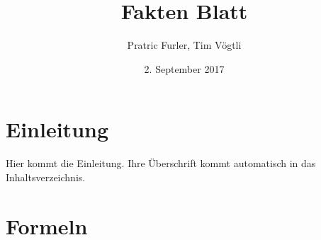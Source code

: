 \documentclass{scrartcl}
\title{Fakten Blatt}
\author{Pratric Furler, Tim Vögtli}
\date{2. September 2017}
\begin{document}
\maketitle
\section{Einleitung}

Hier kommt die Einleitung. Ihre Überschrift kommt
automatisch in das Inhaltsverzeichnis.

\section{Formeln}
\end{document}

